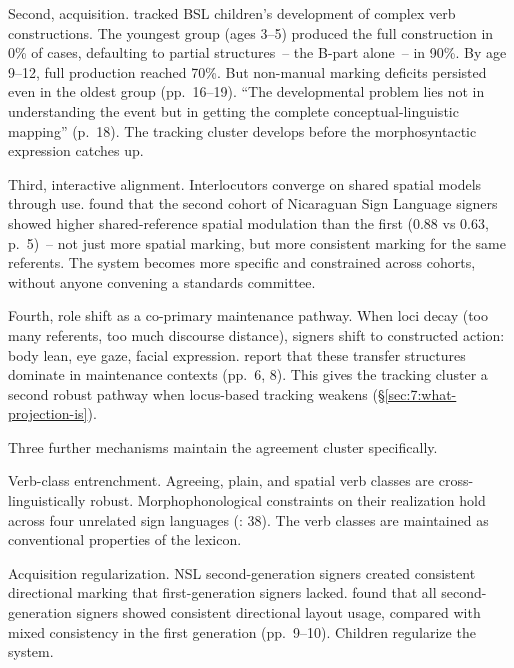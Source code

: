Second, acquisition. \textcite{morgan2002} tracked BSL children's development of complex verb constructions. The youngest group (ages 3--5) produced the full construction in 0\% of cases, defaulting to partial structures~-- the B-part alone~-- in 90\%. By age 9--12, full production reached 70\%. But non-manual marking deficits persisted even in the oldest group (pp.~16--19). \enquote{The developmental problem lies not in understanding the event but in getting the complete conceptual-linguistic mapping} (p.~18). The tracking cluster develops before the morphosyntactic expression catches up.

Third, interactive alignment. Interlocutors converge on shared spatial models through use. \textcite{senghas2001} found that the second cohort of Nicaraguan Sign Language signers showed higher shared-reference spatial modulation than the first (0.88 vs 0.63, p.~5)~-- not just more spatial marking, but more consistent marking for the same referents. The system becomes more specific and constrained across cohorts, without anyone convening a standards committee.

Fourth, role shift as a co-primary maintenance pathway. When loci decay (too many referents, too much discourse distance), signers shift to constructed action: body lean, eye gaze, facial expression. \textcite{garcia2020} report that these transfer structures dominate in maintenance contexts (pp.~6, 8). This gives the tracking cluster a second robust pathway when locus-based tracking weakens (§\ref{sec:7:what-projection-is}).

Three further mechanisms maintain the agreement cluster specifically.

Verb-class entrenchment. Agreeing, plain, and spatial verb classes are cross-linguistically robust. Morphophonological constraints on their realization hold across four unrelated sign languages (\citealt{sandler2006}: 38). The verb classes are maintained as conventional properties of the lexicon.

Acquisition regularization. NSL second-generation signers created consistent directional marking that first-generation signers lacked. \textcite{senghas1997} found that all second-generation signers showed consistent directional layout usage, compared with mixed consistency in the first generation (pp.~9--10). Children regularize the system.


